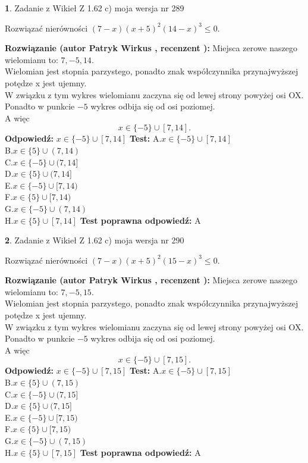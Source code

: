 \documentclass[12pt, a4paper]{article}
\theoremstyle{definition} %
\newtheorem{zad}{}
\newcommand{\zadStart}[1]{\begin{zad}#1\newline}
\newcommand{\zadStop}{\end{zad}}
\newcommand{\rozwStart}[2]{\noindent \textbf{Rozwiązanie (autor #1 , recenzent #2): }\newline}
\newcommand{\rozwStop}{\newline}
\newcommand{\odpStart}{\noindent \textbf{Odpowiedź:}\newline}
\newcommand{\odpStop}{\newline}
\newcommand{\testStart}{\noindent \textbf{Test:}\newline}
\newcommand{\testStop}{\newline}
\newcommand{\kluczStart}{\noindent \textbf{Test poprawna odpowiedź:}\newline}
\newcommand{\kluczStop}{\newline}
\begin{document}
\zadStart{Zadanie z Wikieł Z 1.62 c) moja wersja nr 289}

Rozwiązać nierówności $(7-x)(x+5)^{2}(14-x)^{3}\le0$.
\zadStop
\rozwStart{Patryk Wirkus}{}
Miejsca zerowe naszego wielomianu to: $7, -5, 14$.\\
Wielomian jest stopnia parzystego, ponadto znak współczynnika przy\linebreak najwyższej potędze x jest ujemny.\\ W związku z tym wykres wielomianu zaczyna się od lewej strony powyżej osi OX.\\
Ponadto w punkcie $-5$ wykres odbija się od osi poziomej.\\
A więc $$x \in \{-5\} \cup [7,14].$$
\rozwStop
\odpStart
$x \in \{-5\} \cup [7,14]$
\odpStop
\testStart
A.$x \in \{-5\} \cup [7,14]$\\
B.$x \in \{5\} \cup (7,14)$\\
C.$x \in \{-5\} \cup (7,14]$\\
D.$x \in \{5\} \cup (7,14]$\\
E.$x \in \{-5\} \cup [7,14)$\\
F.$x \in \{5\} \cup [7,14)$\\
G.$x \in \{-5\} \cup (7,14)$\\
H.$x \in \{5\} \cup [7,14]$
\testStop
\kluczStart
A
\kluczStop



\zadStart{Zadanie z Wikieł Z 1.62 c) moja wersja nr 290}

Rozwiązać nierówności $(7-x)(x+5)^{2}(15-x)^{3}\le0$.
\zadStop
\rozwStart{Patryk Wirkus}{}
Miejsca zerowe naszego wielomianu to: $7, -5, 15$.\\
Wielomian jest stopnia parzystego, ponadto znak współczynnika przy\linebreak najwyższej potędze x jest ujemny.\\ W związku z tym wykres wielomianu zaczyna się od lewej strony powyżej osi OX.\\
Ponadto w punkcie $-5$ wykres odbija się od osi poziomej.\\
A więc $$x \in \{-5\} \cup [7,15].$$
\rozwStop
\odpStart
$x \in \{-5\} \cup [7,15]$
\odpStop
\testStart
A.$x \in \{-5\} \cup [7,15]$\\
B.$x \in \{5\} \cup (7,15)$\\
C.$x \in \{-5\} \cup (7,15]$\\
D.$x \in \{5\} \cup (7,15]$\\
E.$x \in \{-5\} \cup [7,15)$\\
F.$x \in \{5\} \cup [7,15)$\\
G.$x \in \{-5\} \cup (7,15)$\\
H.$x \in \{5\} \cup [7,15]$
\testStop
\kluczStart
A
\kluczStop
\end{document}
